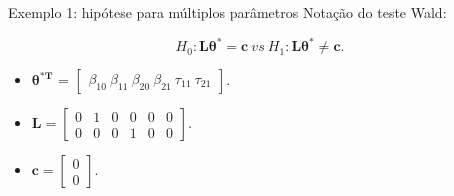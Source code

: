\documentclass[
  ignorenonframetext,
  serif,
  professionalfont,
  usenames,
  dvipsnames,
  aspectratio = 169]{beamer}
\begin{document}
\begin{frame}{Exemplo 1: hipótese para múltiplos parâmetros}
\protect\hypertarget{exemplo-1-hipuxf3tese-para-muxfaltiplos-paruxe2metros-1}{}
Notação do teste Wald:

\[H_0: \boldsymbol{L}\boldsymbol{\theta^{*}} = \boldsymbol{c} \ vs \ H_1: \boldsymbol{L}\boldsymbol{\theta^{*}} \neq \boldsymbol{c}.\]

\begin{itemize}
  
    \item $\boldsymbol{\theta^{*T}}$ = $\begin{bmatrix} \beta_{10} \  \beta_{11} \ \beta_{20} \ \beta_{21} \ \tau_{11} \ \tau_{21} \end{bmatrix}$.

    \item $\boldsymbol{L} = \begin{bmatrix} 0 & 1 & 0 & 0 & 0 & 0 \\
0 & 0 & 0 & 1 & 0 & 0 \end{bmatrix}.$
 
  \item $\boldsymbol{c} = \begin{bmatrix} 0 \\ 0 \end{bmatrix}.$

  \end{itemize}
\end{frame}
\end{document}
